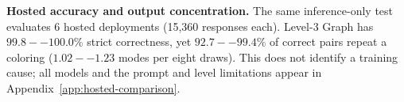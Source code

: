 \noindent\textbf{Hosted accuracy and output concentration.}
\label{sec:hosted-concentration}
The same inference-only test evaluates 6 hosted deployments (15,360 responses each).
Level-3 Graph has $99.8--100.0\%$ strict correctness, yet $92.7--99.4\%$ of correct
pairs repeat a coloring ($1.02--1.23$ modes per eight draws). This does not
identify a training cause; all models and the prompt and level limitations
appear in Appendix~\ref{app:hosted-comparison}.
